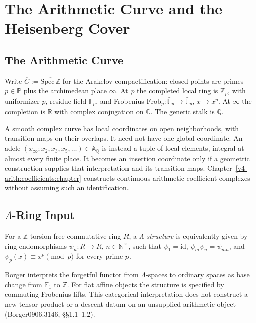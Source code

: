 \chapter{The Arithmetic Curve and the Heisenberg Cover}
\label{v4-arith:construction}

\section{The Arithmetic Curve}
\label{v4-arith:construction:curve}

Write \(\overline{C}:=\overline{\mathrm{Spec}\,\mathbb{Z}}\) for the
Arakelov compactification: closed points are primes \(p\in\mathbb{P}\)
plus the archimedean place \(\infty\). At \(p\) the completed local ring
is \(\mathbb{Z}_{p}\), with uniformizer \(p\), residue field
\(\mathbb{F}_{p}\), and Frobenius
\(\mathrm{Frob}_{p}\colon\bar{\mathbb{F}}_{p}\to\bar{\mathbb{F}}_{p}\),
\(x\mapsto x^{p}\). At \(\infty\) the completion is \(\mathbb{R}\) with
complex conjugation on \(\mathbb{C}\). The generic stalk is
\(\mathbb{Q}\).

A smooth complex curve has local coordinates on open neighborhoods,
with transition maps on their overlaps. It need not have one global
coordinate. An adele
\((x_{\infty};x_{2},x_{3},x_{5},\ldots)\in\mathbb A_{\mathbb Q}\)
is instead a tuple of local elements, integral at almost every finite
place. It becomes an insertion coordinate only if a geometric
construction supplies that interpretation and its transition maps.
Chapter~\ref{v4-arith:coefficients:chapter} constructs continuous
arithmetic coefficient complexes without assuming such an identification.

\section{\texorpdfstring{\(\Lambda\)}{Lambda}-Ring Input}
\label{v4-arith:construction:lambda-ring}

\begin{definition}
\label{v4-arith:def:lambda-ring}
For a \(\mathbb Z\)-torsion-free commutative ring \(R\), a
\emph{\(\Lambda\)-structure} is equivalently given by
ring endomorphisms \(\psi_{n}\colon R\to R\), \(n\in\mathbb{N}^{\times}\),
such that \(\psi_{1}=\mathrm{id}\), \(\psi_{m}\psi_{n}=\psi_{mn}\), and
\(\psi_{p}(x)\equiv x^{p}\pmod{p}\) for every prime \(p\).
\end{definition}

\begin{theorem}
\label{v4-arith:thm:lambda-ring-descent}

Borger interprets the forgetful functor from \(\Lambda\)-spaces to
ordinary spaces as base change from \(\mathbb F_1\) to \(\mathbb Z\).
For flat affine objects the structure is specified by commuting
Frobenius lifts. This categorical interpretation does not construct a
new tensor product or a descent datum on an unsupplied arithmetic object
(Borger0906.3146, \S\S1.1--1.2).
\end{theorem}

